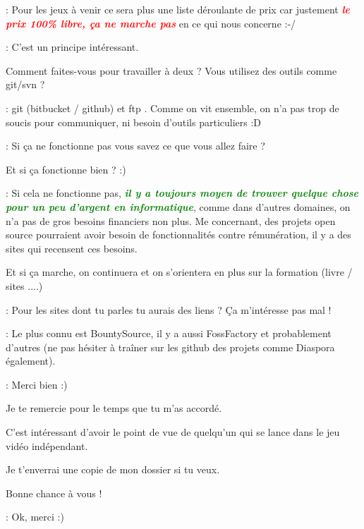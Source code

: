 \documentclass[a4paper,12pt, draft]{report}
\newcommand{\goodPoint}[1]{\textcolor{green}{\textbf{\textit{#1}}}}
\newcommand{\badPoint}[1]{\textcolor{red}{\textbf{\textit{#1}}}}
\begin{document}
\begin{description}
\item 
\item [Réponse]: Pour les jeux à venir ce sera plus une liste déroulante de prix car justement \badPoint{le prix 100\% libre, ça ne marche pas} en ce qui nous concerne :-/
\item 
\item [Question]: C'est un principe intéressant.
\item Comment faites-vous pour travailler à deux ? Vous utilisez des outils comme git/svn ?
\item 
\item [Réponse]: git (bitbucket / github) et ftp  . Comme on vit ensemble, on n'a pas trop de soucis pour communiquer, ni besoin d'outils particuliers :D
\item 
\item [Question]: Si ça ne fonctionne pas vous savez ce que vous allez faire ?
\item Et si ça fonctionne bien ? :)
\item 
\item [Réponse]: Si cela ne fonctionne pas, \goodPoint{il y a toujours moyen de trouver quelque chose pour un peu d'argent en informatique}, comme dans d'autres domaines, on n'a pas de gros besoins financiers non plus. Me concernant, des projets open source pourraient avoir besoin de fonctionnalités contre rémunération, il y a des sites qui recensent ces besoins.
\item Et si ça marche, on continuera et on s'orientera en plus sur la formation (livre / sites ....)
\item 
\item [Question]: Pour les sites dont tu parles tu aurais des liens ? Ça m'intéresse pas mal !
\item 
\item [Réponse]: Le plus connu est BountySource\cite{bountySource}, il y a aussi FossFactory\cite{fossfactory} et probablement d'autres (ne pas hésiter à traîner sur les github des projets comme Diaspora également).
\item 
\item [Question]: Merci bien :)
\item Je te remercie pour le temps que tu m'as accordé. 
\item C'est intéressant d'avoir le point de vue de quelqu'un qui se lance dans le jeu vidéo indépendant.
\item Je t'enverrai une copie de mon dossier si tu veux.
\item Bonne chance à vous !
\item 
\item [Réponse]: Ok, merci :)

\end{description}
\end{document}
